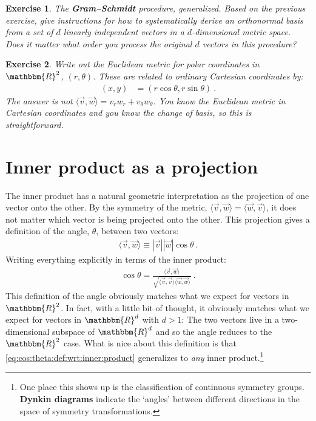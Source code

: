 \documentclass[
  11pt,
	colorful,
	raggedright,
]{tufte-style-thesis-flip}
\newtheorem{exercise}{Exercise}[section]
\begin{document}
\begin{exercise} The \textbf{Gram--Schmidt} procedure, generalized.
Based on the previous exercise, give instructions for how to systematically derive an orthonormal basis from a set of $d$ linearly independent vectors in a $d$-dimensional metric space. Does it matter what order you process the original $d$ vectors in this procedure?
\end{exercise}


\begin{exercise}\label{ex:polar:coordinates} Write out the Euclidean metric for polar coordinates in $\mathbbm{R}^2$, $(r,\theta)$. These are related to ordinary Cartesian coordinates by:
\begin{align}
  (x,y) &= (r\cos\theta, r\sin\theta) \ .
\end{align}
The answer is \emph{not} $\langle \vec{v},\vec{w}\rangle = v_rw_r + v_\theta w_\theta$. You know the Euclidean metric in Cartesian coordinates and you know the change of basis, so this is straightforward. 
\end{exercise}


\section{Inner product as a projection}


The inner product has a natural geometric interpretation as the projection of one vector onto the other. By the symmetry of the metric, $\langle \vec v, \vec w \rangle = \langle \vec w, \vec v \rangle$, it does not matter which vector is being projected onto the other. This projection gives a definition of the angle, $\theta$, between two vectors:
\begin{align}
  \langle \vec v , \vec w \rangle \equiv |\vec v| |\vec w| \cos \theta \ .
\end{align}
Writing everything explicitly in terms of the inner product:
\begin{align}
  \cos \theta = \frac{\langle \vec v , \vec w \rangle}{\sqrt{\langle \vec v , \vec v \rangle\langle \vec w , \vec w \rangle}} \ .
  \label{eq:cos:theta:def:wrt:inner:product}
\end{align}
This definition of the angle obviously matches what we expect for vectors in $\mathbbm{R}^2$. In fact, with a little bit of thought, it obviously matches what we expect for vectors in $\mathbbm{R}^d$ with $d>1$: The two vectors live in a two-dimensional subspace of $\mathbbm{R}^d$ and so the angle reduces to the $\mathbbm{R}^2$ case. What is nice about this definition is that \eqref{eq:cos:theta:def:wrt:inner:product} generalizes to \emph{any} inner product.\footnote{One place this shows up is the classification of continuous symmetry groups. \textbf{Dynkin diagrams} indicate the `angles' between different directions in the space of symmetry transformations.} 
\end{document}

